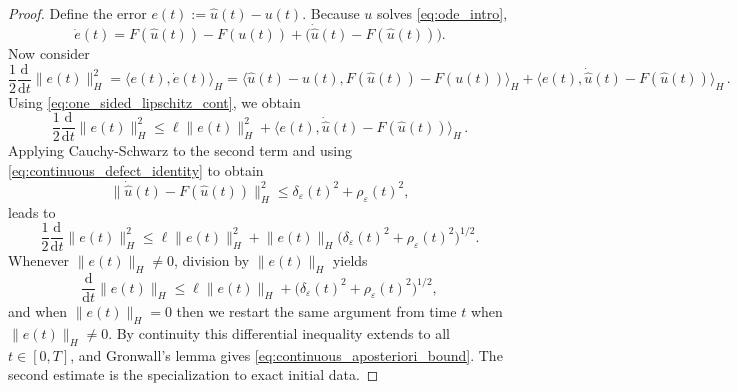 \documentclass[oneside,11pt]{article}
\theoremstyle{remark}
\theoremstyle{thmstyleone}
\theoremstyle{thmstylethree}
\theoremstyle{thmstyletwo}
\newcommand{\norm}[1]{\lVert #1\rVert}
\newcommand{\dd}{\mathrm{d}}
\begin{document}
   \begin{proof}
          Define the error $e(t):=\hat u(t)-u(t)$.
          Because $u$ solves \eqref{eq:ode_intro},
          \begin{equation*}
            \dot e(t)=F(\hat u(t))-F(u(t))+\bigl(\dot{\hat u}(t)-F(\hat u(t))\bigr).
          \end{equation*}
        Now consider
          \begin{equation*}
            \frac12\frac{\dd}{\dd t}\norm{e(t)}_H^2 = \langle e(t), \dot{e}(t)\rangle_H
             = \langle \hat{u}(t) - u(t), F(\hat{u}(t)) - F(u(t)) \rangle_H + \langle e(t), \dot{\hat{u}}(t) - F(\hat{u}(t))\rangle_H\,.
          \end{equation*}
Using \eqref{eq:one_sided_lipschitz_cont}, we obtain 
\[
\frac12\frac{\dd}{\dd t}\norm{e(t)}_H^2 \leq \ell \|e(t)\|_H^2 + \langle e(t), \dot{\hat{u}}(t) - F(\hat{u}(t))\rangle_H\,.
\]
Applying Cauchy-Schwarz to the second term and using  \eqref{eq:continuous_defect_identity} to obtain  
          \begin{equation*}
            \norm{\dot{\hat u}(t)-F(\hat u(t))}_H^2
            \le
            \delta_\varepsilon(t)^2+\rho_\varepsilon(t)^2,
          \end{equation*}
        leads to
          \begin{equation*}
            \frac12\frac{\dd}{\dd t}\norm{e(t)}_H^2 
            \le
            \ell\norm{e(t)}_H^2
            +
            \norm{e(t)}_H
            \bigl(\delta_\varepsilon(t)^2+\rho_\varepsilon(t)^2\bigr)^{1/2}.
          \end{equation*}
          Whenever $\|e(t)\|_H\neq0$, division by $\norm{e(t)}_H$ yields
          \begin{equation*}
            \frac{\dd}{\dd t}\norm{e(t)}_H
            \le
            \ell\norm{e(t)}_H+\bigl(\delta_\varepsilon(t)^2+\rho_\varepsilon(t)^2\bigr)^{1/2},
          \end{equation*}
          and when $\|e(t)\|_H = 0$ then we restart the same argument from time $t$ when $\|e(t)\|_H \neq 0$.  
          By continuity this differential inequality extends to all $t\in[0,T]$, and Gronwall's lemma gives \eqref{eq:continuous_aposteriori_bound}.
          The second estimate is the specialization to exact initial data.
        \end{proof}
\end{document}
